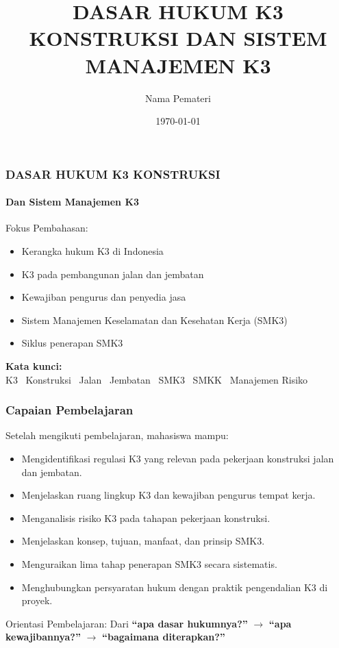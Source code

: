 \documentclass[../main.tex]{subfiles}
\title{DASAR HUKUM K3 KONSTRUKSI DAN SISTEM MANAJEMEN K3}
\author{Nama Pemateri}
\date{\today}
\begin{document}
\begin{frame}[mytitle=center,c,mycolor=digiPH_ocean!15]
	\frametitle{DASAR HUKUM K3 KONSTRUKSI}
	\framesubtitle{Dan Sistem Manajemen K3}

	\begin{block}{Fokus Pembahasan:}
		\begin{itemize}
			\item Kerangka hukum K3 di Indonesia
			\item K3 pada pembangunan jalan dan jembatan
			\item Kewajiban pengurus dan penyedia jasa
			\item Sistem Manajemen Keselamatan dan Kesehatan Kerja (SMK3)
			\item Siklus penerapan SMK3
		\end{itemize}
	\end{block}

	\vspace{0.5cm}
	\textbf{Kata kunci:}\\
	K3 \textbullet\ Konstruksi \textbullet\ Jalan \textbullet\ Jembatan \textbullet\ SMK3 \textbullet\ SMKK \textbullet\ Manajemen Risiko
\end{frame}

\begin{frame}[mytitle=standard,t,mycolor=digiPH_cream!40]
	\frametitle{Capaian Pembelajaran}

	Setelah mengikuti pembelajaran, mahasiswa mampu:
	\begin{itemize}
		\item Mengidentifikasi regulasi K3 yang relevan pada pekerjaan konstruksi jalan dan jembatan.
		\item Menjelaskan ruang lingkup K3 dan kewajiban pengurus tempat kerja.
		\item Menganalisis risiko K3 pada tahapan pekerjaan konstruksi.
		\item Menjelaskan konsep, tujuan, manfaat, dan prinsip SMK3.
		\item Menguraikan lima tahap penerapan SMK3 secara sistematis.
		\item Menghubungkan persyaratan hukum dengan praktik pengendalian K3 di proyek.
	\end{itemize}

	\begin{exampleblock}{Orientasi Pembelajaran:}
		Dari \textbf{“apa dasar hukumnya?”} $\rightarrow$ \textbf{“apa kewajibannya?”} $\rightarrow$ \textbf{“bagaimana diterapkan?”}
	\end{exampleblock}
\end{frame}
\end{document}
